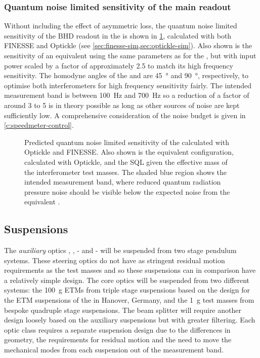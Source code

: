 \subsubsection{Quantum noise limited sensitivity of the main readout}
Without including the effect of asymmetric loss, the quantum noise limited sensitivity of the \gls{BHD} readout in the \SSMEXPT{} is shown in \cref{fig:erc-ssm-qnls}, calculated with both \gls{FINESSE} and Optickle (see \cref{sec:finesse-sim,sec:optickle-sim}). Also shown is the sensitivity of an equivalent \FPMI{} using the same parameters as for the \SSM{}, but with input power scaled by a factor of approximately \num{2.5} to match its high frequency sensitivity. The homodyne angles of the \SSM{} and \MI{} are \SI{45}{\degree} and \SI{90}{\degree}, respectively, to optimise both interferometers for high frequency sensitivity fairly. The intended measurement band is between \SI{100}{\hertz} and \SI{700}{\hertz} so a reduction of a factor of around \num{3} to \num{5} is in theory possible as long as other sources of noise are kept sufficiently low. A comprehensive consideration of the noise budget is given in \cref{c:speedmeter-control}.

\begin{figure}
  \centering
  
  \caption[Predicted quantum noise limited sensitivity of the \SSMEXPT{}]{\label{fig:erc-ssm-qnls}Predicted quantum noise limited sensitivity of the \SSMEXPT{} calculated with Optickle and \gls{FINESSE}. Also shown is the equivalent \FPMI{} configuration, calculated with Optickle, and the \gls{SQL} given the effective mass of the interferometer test masses. The shaded blue region shows the intended measurement band, where reduced quantum radiation pressure noise should be visible below the expected noise from the equivalent \FPMI{}.}
\end{figure}

\subsection{Suspensions}
The \emph{auxiliary} optics \MFOUR{}, \MFIVE{}, \MSEVEN{}-\MTEN{} and \MTWELVE{}-\MFIFTEEN{} will be suspended from two stage pendulum systems. These steering optics do not have as stringent residual motion requirements as the test masses and so these suspensions can in comparison have a relatively simple design. The core optics will be suspended from two different systems: the \SI{100}{\gram} \glspl{ETM} from triple stage suspensions based on the design for the \gls{ETM} suspensions of the \AEIPROTOTYPE{} in Hanover, Germany, and the \SI{1}{\gram} test masses from bespoke quadruple stage suspensions. The beam splitter \MSIX{} will require another design loosely based on the auxiliary suspensions but with greater filtering. Each optic class requires a separate suspension design due to the differences in geometry, the requirements for residual motion and the need to move the mechanical modes from each suspension out of the measurement band.

